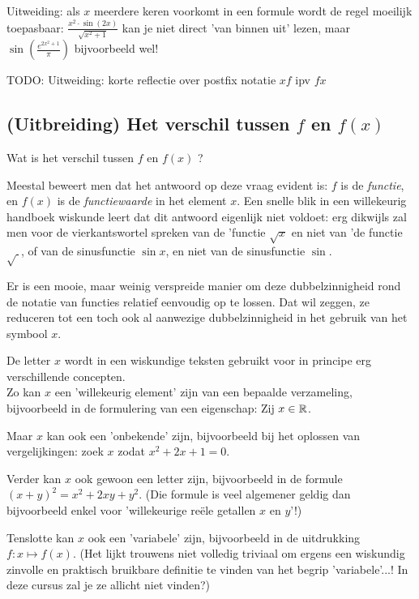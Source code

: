 \documentclass{ximera}
\begin{document}
Uitweiding: als $x$ meerdere keren voorkomt in een formule wordt de regel moeilijk toepasbaar: $\displaystyle\frac{x^2\cdot\sin(2x)}{\sqrt{x^2+1}}$ kan je niet direct 'van binnen uit' lezen, maar $\displaystyle\sin(\frac{e^{2x^2+1}}{\pi})$ bijvoorbeeld wel!

TODO: Uitweiding: korte reflectie over postfix notatie $xf$ ipv $fx$

\subsection{(Uitbreiding) Het verschil tussen $f$ en $f(x)$}

\begin{uitweiding} Wat is het verschil tussen $f$ en $f(x)$ ?

Meestal beweert men dat het antwoord op deze vraag evident is: $f$ is de \textit{functie}, en $f(x)$ is de \textit{functiewaarde} in het element $x$. Een snelle blik in een willekeurig handboek wiskunde leert dat dit antwoord  eigenlijk niet voldoet: erg dikwijls zal men voor de vierkantswortel spreken van de 'functie $\sqrt{x}$ en niet van 'de functie $\sqrt{\ }$, of van de sinusfunctie $\sin x$, en niet van de sinusfunctie $\sin$.

\begin{expandable}
Er is een mooie, maar weinig verspreide manier om deze dubbelzinnigheid rond de notatie van functies relatief eenvoudig op te lossen. Dat wil zeggen, ze reduceren tot een toch ook al aanwezige dubbelzinnigheid in het gebruik van het symbool $x$. 

De letter $x$ wordt in een wiskundige teksten gebruikt voor in principe erg verschillende concepten. 
\\

Zo kan $x$ een 'willekeurig element' zijn van een bepaalde verzameling, bijvoorbeeld in de formulering van een eigenschap: Zij $x\in\mathbb{R}$.

Maar $x$ kan ook een 'onbekende' zijn, bijvoorbeeld bij het oplossen van vergelijkingen: zoek $x$ zodat $x^2+2x+1=0$. 

Verder kan $x$ ook gewoon een letter zijn, bijvoorbeeld in de formule $(x+y)^2 = x^2+2xy+y^2$. (Die formule is veel algemener geldig dan bijvoorbeeld enkel voor 'willekeurige reële getallen $x$ en $y$'!)

Tenslotte kan $x$ ook een 'variabele' zijn, bijvoorbeeld in de uitdrukking $f:x\mapsto f(x)$. (Het lijkt trouwens niet volledig triviaal om ergens een wiskundig zinvolle en praktisch bruikbare definitie te vinden van het begrip 'variabele'...! In deze cursus zal je ze allicht niet vinden?)



\end{expandable}
\end{uitweiding}
\end{document}

